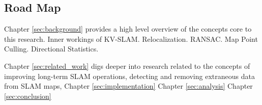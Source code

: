 \subsection{Road Map}

Chapter \ref{sec:background} provides a high level overview of the concepts core to this research. Inner workings of KV-SLAM. Relocalization. RANSAC. Map Point Culling. Directional Statistics.

Chapter \ref{sec:related_work} digs deeper into research related to the concepts of improving long-term SLAM operations, detecting and removing extraneous data from SLAM maps, 
Chapter \ref{sec:implementation}
Chapter \ref{sec:analysis}
Chapter \ref{sec:conclusion}